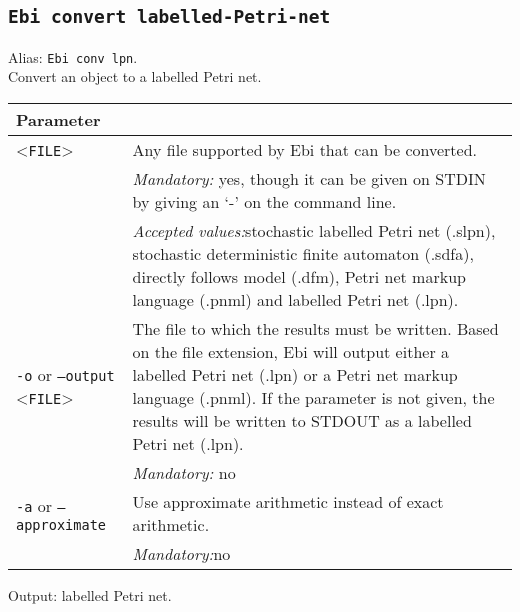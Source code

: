 {\subsection{\texttt{Ebi convert labelled-Petri-net}}
\label{command:Ebi convert labelled-Petri-net}
Alias: \texttt{Ebi conv lpn}.\\
Convert an object to a labelled Petri net.\\
\begin{tabularx}{\linewidth}{lX}
\toprule
Parameter \\\midrule
<\texttt{FILE}>&Any file supported by Ebi that can be converted.\\
&\textit{Mandatory:} \quad yes, though it can be given on STDIN by giving an `-' on the command line.\\
&\textit{Accepted values:}\quad stochastic labelled Petri net (.slpn), stochastic deterministic finite automaton (.sdfa), directly follows model (.dfm), Petri net markup language (.pnml) and labelled Petri net (.lpn).\\
\texttt{-o} or \texttt{--output} <\texttt{FILE}> &
The file to which the results must be written. Based on the file extension, Ebi will output either a labelled Petri net (.lpn) or a Petri net markup language (.pnml).
If the parameter is not given, the results will be written to STDOUT as a labelled Petri net (.lpn).\\
&\textit{Mandatory:} \quad no\\
\texttt{-a} or \texttt{--approximate} & Use approximate arithmetic instead of exact arithmetic.\\
&\textit{Mandatory:}\quad no\\
\bottomrule
\end{tabularx}
Output: labelled Petri net.
}

